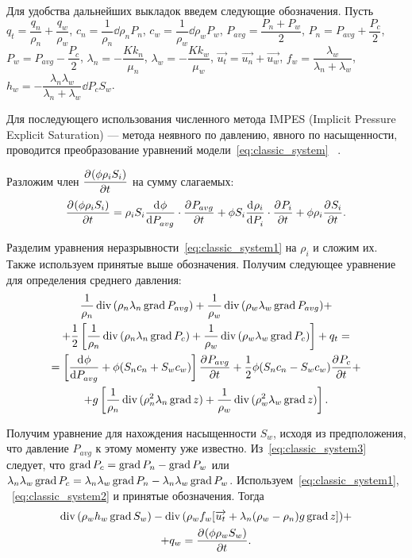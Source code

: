 Для удобства дальнейших выкладок введем следующие обозначения.
Пусть $q_t = \dfrac{q_n}{\rho_n} + \dfrac{q_w}{\rho_w}$,
$c_n = \dfrac{1}{\rho_n} \dd{\rho_n}{P_n}$,
$c_w = \dfrac{1}{\rho_w} \dd{\rho_w}{P_w}$,
$P_{avg} = \dfrac{P_n + P_w}{2}$,
$P_n = P_{avg} + \dfrac{P_c}{2}$,
$P_w = P_{avg} - \dfrac{P_c}{2}$,
$\lambda_n = -\dfrac{K k_n}{\mu_n}$,
$\lambda_w = -\dfrac{K k_w}{\mu_w}$,
$\overrightarrow{u_t} = \overrightarrow{u_n} + \overrightarrow{u_w}$,
$f_w = \dfrac{\lambda_w}{\lambda_n + \lambda_w}$,
$h_w = - \dfrac{\lambda_n\lambda_w}{\lambda_n + \lambda_w} \dd{P_c}{S_w}$.

Для последующего использования численного метода IMPES (Implicit Pressure Explicit Saturation) --- метода неявного по давлению,
явного по насыщенности, проводится преобразование уравнений модели~\eqref{eq:classic_system} ~\cite{Peaceman}.

Разложим член $\dfrac{\partial^{} (\phi \rho_i S_i)}{\partial t^{}}$ на сумму слагаемых:
\begin{equation}
 \dfrac{\partial^{} (\phi \rho_i S_i)}{\partial t^{}} = \rho_i S_i \dfrac{\mathrm d^{} \phi}{\mathrm d P_{avg}^{}} \cdot \dfrac{\partial^{} P_{avg}}{\partial t^{}}
 + \phi S_i \dfrac{\mathrm d^{} \rho_i}{\mathrm d P_i^{}} \cdot \dfrac{\partial^{} P_i}{\partial t^{}} + \phi \rho_i \dfrac{\partial^{} S_i}{\partial t^{}}.
\end{equation}

Разделим уравнения неразрывности~\eqref{eq:classic_system1} на $\rho_i$ 
и сложим их. Также используем принятые выше обозначения.
Получим следующее уравнение для определения среднего давления:
\begin{equation} \label{eq:classic_pressure}
 \begin{gathered}
  \frac{1}{\rho_n} \mathop{\mathrm{div}}\nolimits{ (\rho_n\lambda_n\mathop{\mathrm{grad}}\nolimits{ P_{avg}})} + \frac{1}{\rho_w} \mathop{\mathrm{div}}\nolimits{ (\rho_w\lambda_w\mathop{\mathrm{grad}}\nolimits{ P_{avg}})} +\\
  + \frac{1}{2} \left[ \frac{1}{\rho_n} \mathop{\mathrm{div}}\nolimits{ (\rho_n\lambda_n\mathop{\mathrm{grad}}\nolimits{ P_c})} + \frac{1}{\rho_w} \mathop{\mathrm{div}}\nolimits{ (\rho_w\lambda_w\mathop{\mathrm{grad}}\nolimits{ P_c})}\right] + q_t =\\
  = \left[ \dfrac{\mathrm d^{} \phi}{\mathrm d P_{avg}^{}} + \phi (S_n c_n + S_w c_w) \right] \dfrac{\partial^{} P_{avg}}{\partial t^{}} +
  \frac{1}{2} \phi (S_n c_n - S_w c_w) \dfrac{\partial^{} P_{c}}{\partial t^{}} +\\
  + g \left[ \frac{1}{\rho_n} \mathop{\mathrm{div}}\nolimits{ (\rho_n^2\lambda_n\mathop{\mathrm{grad}}\nolimits{ z})} + \frac{1}{\rho_w} \mathop{\mathrm{div}}\nolimits{ (\rho_w^2\lambda_w\mathop{\mathrm{grad}}\nolimits{ z})} \right].
 \end{gathered}
\end{equation}

Получим уравнение для нахождения насыщенности $S_w$, исходя из предположения,
что давление $P_{avg}$ к этому моменту уже известно.
Из~\eqref{eq:classic_system3} следует, что $\mathop{\mathrm{grad}}\nolimits{ P_c} = \mathop{\mathrm{grad}}\nolimits{ P_n} - \mathop{\mathrm{grad}}\nolimits{ P_w}$ или
$\lambda_n\lambda_w\mathop{\mathrm{grad}}\nolimits{ P_c} = \lambda_n\lambda_w\mathop{\mathrm{grad}}\nolimits{ P_n} - \lambda_n\lambda_w\mathop{\mathrm{grad}}\nolimits{ P_w}$.
Используем~\eqref{eq:classic_system1}, ~\eqref{eq:classic_system2} и принятые обозначения.
Тогда
\begin{equation} \label{eq:classic_saturation}
 \begin{gathered}
  \mathop{\mathrm{div}}\nolimits{(\rho_w h_w \mathop{\mathrm{grad}}\nolimits{ S_w})} - \mathop{\mathrm{div}}\nolimits{(\rho_w f_w[\overrightarrow{u_t} + \lambda_n(\rho_w - \rho_n)g \mathop{\mathrm{grad}}\nolimits{ z}])} + \\
  + q_w = \dfrac{\partial^{} (\phi \rho_w S_w)}{\partial t^{}}.
 \end{gathered}
\end{equation} 
 
